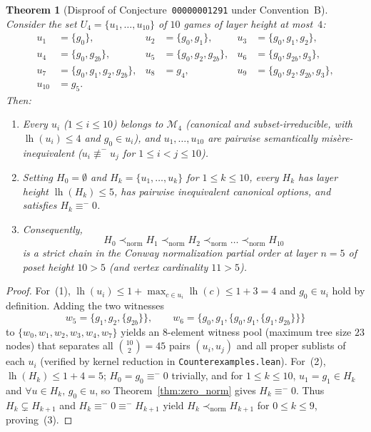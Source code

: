 \documentclass[11pt]{amsart}
\newtheorem{theorem}{Theorem}[section]
\theoremstyle{definition}
\theoremstyle{remark}
\newcommand{\Mlayer}{\mathcal{M}}
\DeclareMathOperator{\lh}{lh}
\begin{document}
\begin{theorem}[Disproof of Conjecture~\texttt{00000001291} under Convention~B]
\label{thm:convB}
Consider the set $U_4 = \{u_1, \dots, u_{10}\}$ of $10$ games of layer height at most~$4$:
\begin{align*}
  u_1 &= \{g_0\}, & u_2 &= \{g_0, g_1\}, & u_3 &= \{g_0, g_1, g_2\},\\
  u_4 &= \{g_0, g_{2b}\}, & u_5 &= \{g_0, g_2, g_{2b}\}, & u_6 &= \{g_0, g_{2b}, g_3\},\\
  u_7 &= \{g_0, g_1, g_2, g_{2b}\}, & u_8 &= g_4, & u_9 &= \{g_0, g_2, g_{2b}, g_3\},\\
  u_{10} &= g_5.
\end{align*}
Then:
\begin{enumerate}
  \item Every $u_i$ ($1 \le i \le 10$) belongs to $\Mlayer_4$ (canonical and subset-irreducible, with $\lh(u_i) \le 4$ and $g_0 \in u_i$), and $u_1, \dots, u_{10}$ are pairwise semantically mis\`ere-inequivalent ($u_i \not\equiv^- u_j$ for $1 \le i < j \le 10$).
  \item Setting $H_0 = \emptyset$ and $H_k = \{u_1, \dots, u_k\}$ for $1 \le k \le 10$, every $H_k$ has layer height $\lh(H_k) \le 5$, has pairwise inequivalent canonical options, and satisfies $H_k \equiv^- 0$.
  \item Consequently,
  \[
    H_0 \prec_{\mathrm{norm}} H_1 \prec_{\mathrm{norm}} H_2 \prec_{\mathrm{norm}} \dots \prec_{\mathrm{norm}} H_{10}
  \]
  is a strict chain in the Conway normalization partial order at layer $n = 5$ of poset height $10 > 5$ (and vertex cardinality $11 > 5$).
\end{enumerate}
\end{theorem}

\begin{proof}
For~(1), $\lh(u_i) \le 1 + \max_{c \in u_i}\lh(c) \le 1 + 3 = 4$ and $g_0 \in u_i$ hold by definition. Adding the two witnesses
\[
  w_5 = \{g_1, g_2, \{g_{2b}\}\}, \qquad
  w_6 = \bigl\{g_0, g_1, \{g_0, g_1, \{g_1, g_{2b}\}\}\bigr\}
\]
to $\{w_0, w_1, w_2, w_3, w_4, w_7\}$ yields an $8$-element witness pool (maximum tree size $23$ nodes) that separates all $\binom{10}{2} = 45$ pairs $(u_i, u_j)$ and all proper sublists of each $u_i$ (verified by kernel reduction in \texttt{Counterexamples.lean}). For~(2), $\lh(H_k) \le 1 + 4 = 5$; $H_0 = g_0 \equiv^- 0$ trivially, and for $1 \le k \le 10$, $u_1 = g_1 \in H_k$ and $\forall u \in H_k,\, g_0 \in u$, so Theorem~\ref{thm:zero_norm} gives $H_k \equiv^- 0$. Thus $H_k \subsetneq H_{k+1}$ and $H_k \equiv^- 0 \equiv^- H_{k+1}$ yield $H_k \prec_{\mathrm{norm}} H_{k+1}$ for $0 \le k \le 9$, proving~(3).
\end{proof}
\end{document}
